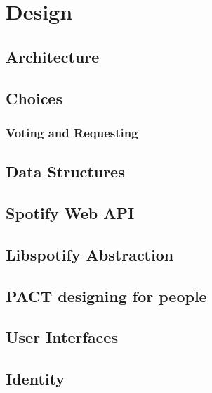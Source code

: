 \chapter{Design}


\section{Architecture}


\section{Choices}



\subsection{Voting and Requesting}


\section{Data Structures}




\section{Spotify Web API}


\section{Libspotify Abstraction}


\section{PACT designing for people}


\section{User Interfaces}


\section{Identity}

